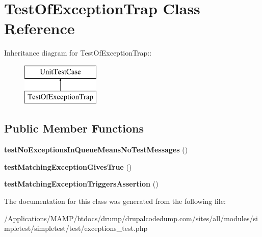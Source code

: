 \hypertarget{class_test_of_exception_trap}{
\section{TestOfExceptionTrap Class Reference}
\label{class_test_of_exception_trap}
}
Inheritance diagram for TestOfExceptionTrap::\begin{figure}[H]
\begin{center}
\leavevmode
\includegraphics[height=2cm]{class_test_of_exception_trap}
\end{center}
\end{figure}
\subsection*{Public Member Functions}
\begin{DoxyCompactItemize}
\item 
\hypertarget{class_test_of_exception_trap_a231e815bfc137ea7bcda88683a40d805}{
{\bfseries testNoExceptionsInQueueMeansNoTestMessages} ()}
\label{class_test_of_exception_trap_a231e815bfc137ea7bcda88683a40d805}

\item 
\hypertarget{class_test_of_exception_trap_af03583ce111513df0177633b838f482d}{
{\bfseries testMatchingExceptionGivesTrue} ()}
\label{class_test_of_exception_trap_af03583ce111513df0177633b838f482d}

\item 
\hypertarget{class_test_of_exception_trap_a55c4a1a315ff3d63bb3fd2d1f3068488}{
{\bfseries testMatchingExceptionTriggersAssertion} ()}
\label{class_test_of_exception_trap_a55c4a1a315ff3d63bb3fd2d1f3068488}

\end{DoxyCompactItemize}


The documentation for this class was generated from the following file:\begin{DoxyCompactItemize}
\item 
/Applications/MAMP/htdocs/drump/drupalcodedump.com/sites/all/modules/simpletest/simpletest/test/exceptions\_\-test.php\end{DoxyCompactItemize}
